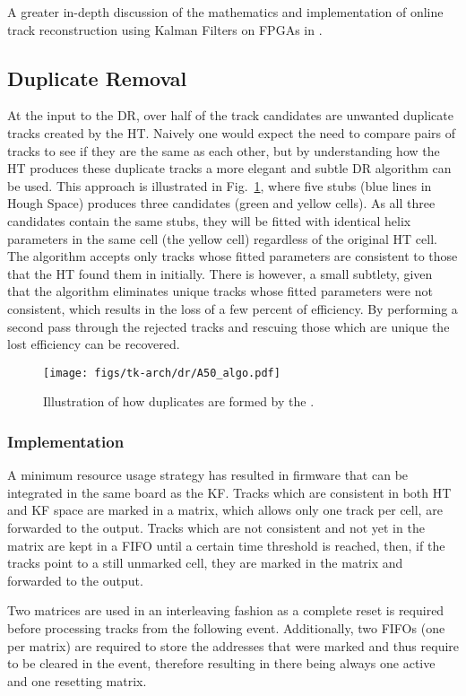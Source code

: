 A greater in-depth discussion of the mathematics and implementation of online track reconstruction using Kalman Filters on FPGAs in \cite{SSummers}.

\subsection{Duplicate Removal}
At the input to the DR, over half of the track candidates are unwanted duplicate tracks created by the HT. Naively one would expect the need to compare pairs of tracks to see if they are the same as each other, but by understanding how the HT produces these duplicate tracks a more elegant and subtle DR algorithm can be used. This approach is illustrated in Fig.~\ref{fig:DR}, where five stubs (blue lines in Hough Space) produces three candidates (green and yellow cells). As all three candidates contain the same stubs, they will be fitted with identical helix parameters in the same cell (the yellow cell) regardless of the original HT cell. The algorithm accepts only tracks whose fitted parameters are consistent to those that the HT found them in initially. There is however, a small subtlety, given that the algorithm eliminates unique tracks whose fitted parameters were not consistent, which results in the loss of a few percent of efficiency. By performing a second pass through the rejected tracks and rescuing those which are unique the lost efficiency can be recovered.


\begin{figure}[!h]
\centering
\texttt{[image: figs/tk-arch/dr/A50\_algo.pdf]}
\caption{Illustration of how duplicates are formed by the \rphi \HT.}
\label{fig:DR}
\end{figure}

\subsubsection{Implementation}
A minimum resource usage strategy has resulted in firmware that can be integrated in the same board as the KF. Tracks which are consistent in both HT and KF space are marked in a matrix, which allows only one track per cell, are forwarded to the output. Tracks which are not consistent and not yet in the matrix are kept in a FIFO until a certain time threshold is reached, then, if the tracks point to a still unmarked cell, they are marked in the matrix and forwarded to the output. 

Two matrices are used in an interleaving fashion as a complete reset is required before processing tracks from the following event. Additionally, two FIFOs (one per matrix) are required to store the addresses that were marked and thus require to be cleared in the event, therefore resulting in there being always one active and one resetting matrix.